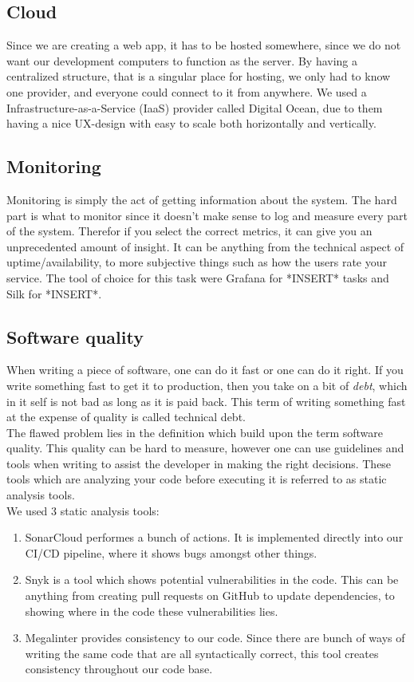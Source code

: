 \subsection*{Cloud}

Since we are creating a web app, it has to be hosted somewhere, since we do not want our development computers to function as the server. By having a centralized structure, that is a singular place for hosting, we only had to know one provider, and everyone could connect to it from anywhere. We used a Infrastructure-as-a-Service (IaaS) provider called Digital Ocean, due to them having a nice UX-design with easy to scale both horizontally and vertically.


\subsection*{Monitoring}
Monitoring is simply the act of getting information about the system. The hard part is what to monitor since it doesn't make sense to log and measure every part of the system. Therefor if you select the correct metrics, it can give you an unprecedented amount of insight. It can be anything from the technical aspect of uptime/availability, to more subjective things such as how the users rate your service. The tool of choice for this task were Grafana for *INSERT* tasks and Silk for *INSERT*.


\subsection*{Software quality}

When writing a piece of software, one can do it fast or one can do it right. If you write something fast to get it to production, then you take on a bit of \textit{debt}, which in it self is not bad as long as it is paid back. This term of writing something fast at the expense of quality is called technical debt. \\
The flawed problem lies in the definition which build upon the term software quality. This quality can be hard to measure, however one can use guidelines and tools when writing to assist the developer in making the right decisions. These tools which are analyzing your code before executing it is referred to as static analysis tools. \\
We used 3 static analysis tools:
\begin{enumerate}
    \item SonarCloud performes a bunch of actions. It is implemented directly into our CI/CD pipeline, where it shows bugs amongst other things. 
    \item Snyk is a tool which shows potential vulnerabilities in the code. This can be anything from creating pull requests on GitHub to update dependencies, to showing where in the code these vulnerabilities lies.
    \item Megalinter provides consistency to our code. Since there are bunch of ways of writing the same code that are all syntactically correct, this tool creates consistency throughout our code base.
\end{enumerate}

